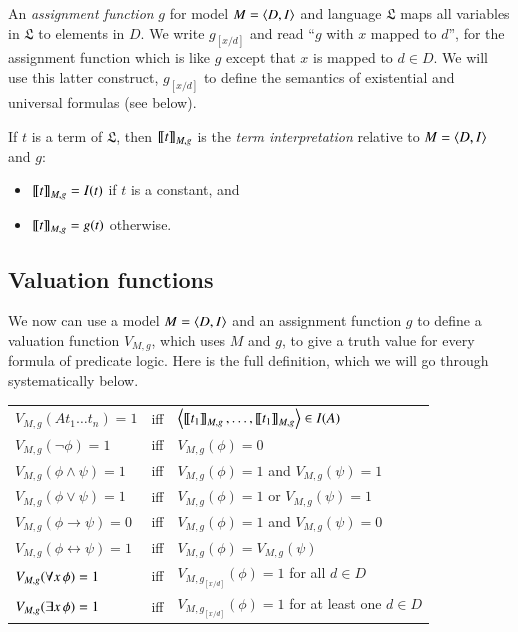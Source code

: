 \documentclass[nobib,nofonts]{tufte-handout}
\begin{document}
An \emph{assignment function} $g$ for model $M = \left \langle D,I\right\rangle$ and language $\mathfrak{L}$ maps all variables in $\mathfrak{L}$ to elements in $D$.
We write $g_{[x/d]}$ and read ``$g$ with $x$ mapped to $d$'', for the assignment function which is like $g$ except that $x$ is mapped to $d \in D$.
We will use this latter construct, $g_{[x/d]}$ to define the semantics of existential and universal formulas (see below).

If $t$ is a term of $\mathfrak{L}$, then $\left [\! \left [ t \right ]\! \right]_{M,g}$ is the \emph{term interpretation} relative to $M = \left \langle D,I\right\rangle$ and $g$:
\begin{multicols}{2}
  \begin{itemize}
    \item[] $\left [\! \left [ t \right ]\! \right]_{M,g} = I(t)$ if $t$ is a constant, and
    \item[] $\left [\! \left [ t \right ]\! \right]_{M,g} = g(t)$ otherwise.
  \end{itemize}
\end{multicols}

\subsection{Valuation functions}
\label{sec:valuation--truth}

We now can use a model $M = \left \langle D, I\right\rangle$ and an assignment function $g$ to define a valuation function $V_{M,g}$, which uses $M$ and $g$, to give a truth value for every formula of predicate logic.
Here is the full definition, which we will go through systematically below.

\medskip

\begin{tabular}{lcl}
  $V_{M,g}(At_1\dots t_n) =1$ & iff & $\left \langle \left [\! \left [ t_1 \right ]\! \right]_{M,g}, \dots, \left [\! \left [ t_1 \right ]\! \right]_{M,g}\right\rangle \in I(A)$\\
  $V_{M,g}(\neg \phi) = 1$ & iff & $V_{M,g}(\phi) =0$\\
  $V_{M,g}(\phi \wedge \psi) = 1$ & iff & $V_{M,g}(\phi) =1$ and $V_{M,g}(\psi) = 1$\\
  $V_{M,g}(\phi \vee \psi) = 1$ & iff & $V_{M,g}(\phi) =1$ or $V_{M,g}(\psi) = 1$\\
  $V_{M,g}(\phi \rightarrow \psi) = 0$ & iff & $V_{M,g}(\phi) =1$ and $V_{M,g}(\psi) = 0$\\
  $V_{M,g}(\phi \leftrightarrow \psi) = 1$ & iff & $V_{M,g}(\phi) = V_{M,g}(\psi)$\\
  $V_{M,g}(\forall x \thinspace \phi) = 1$ & iff & $V_{M,g_{[x/d]}}(\phi) = 1$ for all $d \in D$\\
  $V_{M,g}(\exists x \thinspace \phi) = 1$ & iff & $V_{M,g_{[x/d]}}(\phi) = 1$ for at least one $d \in D$
\end{tabular}
\end{document}
